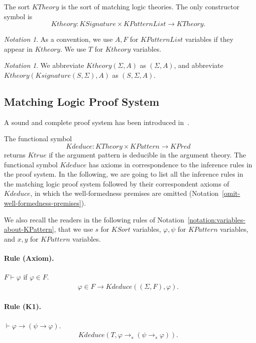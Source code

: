 \documentclass[UTF8,11pt]{article}
\newcounter{thmcounter}
\theoremstyle{plain}
\theoremstyle{definition}
\theoremstyle{remark}
\newtheorem{notation}[thmcounter]{Notation}
\newcommand{\KPred}{\mathit{KPred}}
\newcommand{\Ktrue}{\mathit{Ktrue}}
\newcommand{\KSort}{\mathit{KSort}}
\newcommand{\KPattern}{\mathit{KPattern}}
\newcommand{\KPatternList}{\mathit{KPatternList}}
\newcommand{\kimplies}{\to}
\newcommand{\KSignature}{\mathit{KSignature}}
\newcommand{\Ksignature}{\mathit{Ksignature}}
\newcommand{\KTheory}{\mathit{KTheory}}
\newcommand{\Ktheory}{\mathit{Ktheory}}
\newcommand{\Kdeduce}{\mathit{Kdeduce}}
\begin{document}
The sort $\KTheory$ is the sort of matching logic theories. The only constructor symbol is 
$$\Ktheory \colon \KSignature \times \KPatternList \to \KTheory.$$

\begin{notation}
	As a convention, we use $A, F$ for $\KPatternList$ variables if they appear in $\Ktheory$. We use $T$ for $\Ktheory$ variables.
\end{notation}
\begin{notation}
	We abbreviate $\Ktheory(\Sigma, A)$ as $(\Sigma, A)$, and abbreviate $\Ktheory(\Ksignature(S, \Sigma), A)$ as $(S, \Sigma, A)$. 
\end{notation}

\subsection{Matching Logic Proof System}

A sound and complete proof system has been introduced in~\cite{?}. 

The functional symbol
$$
\Kdeduce \colon \KTheory \times \KPattern \to \KPred
$$
returns $\Ktrue$ if the argument pattern is deducible in the argument theory.
The functional symbol $\Kdeduce$ has axioms in correspondence to the inference rules in the proof system.
In the following, we are going to list all the inference rules in the matching 
logic proof system followed by their correspondent axioms of $\Kdeduce$, in 
which the well-formedness premises are omitted 
(Notation~\ref{omit-well-formedness-premises}).

We also recall the readers in the following rules of 
Notation~\ref{notation:variables-about-KPattern}, 
that we use $s$ for $\KSort$ variables, $\varphi, \psi$ for $\KPattern$ 
variables, and $x, y$ for $\KPattern$ variables. 

\paragraph{Rule (Axiom).}
$F \vdash \varphi$ if $\varphi \in F$.
\begin{align*}
\varphi \in F \to \Kdeduce((\Sigma, F), \varphi).
\end{align*}

\paragraph{Rule (K1).}
$\vdash \varphi \to (\psi \to \varphi)$.
\begin{align*}
\Kdeduce(T, \varphi \kimplies_s (\psi \kimplies_s \varphi)).
\end{align*}
\end{document}
